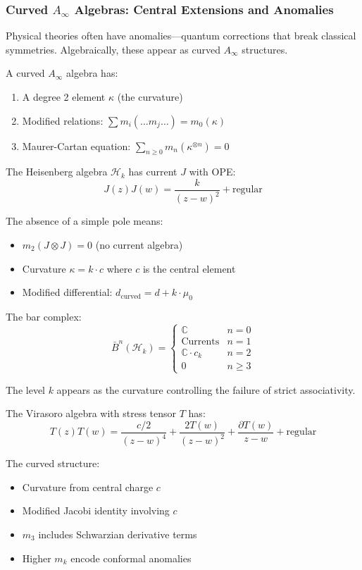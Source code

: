\subsubsection{Curved $A_\infty$ Algebras: Central Extensions and Anomalies}

Physical theories often have anomalies—quantum corrections that break classical symmetries. Algebraically, these appear as curved $A_\infty$ structures.

\begin{definition}
A curved $A_\infty$ algebra has:
\begin{enumerate}
\item A degree 2 element $\kappa$ (the curvature)
\item Modified relations: $\sum m_i(\ldots m_j \ldots) = m_0(\kappa)$
\item Maurer-Cartan equation: $\sum_{n \geq 0} m_n(\kappa^{\otimes n}) = 0$
\end{enumerate}
\end{definition}

\begin{example}
The Heisenberg algebra $\mathcal{H}_k$ has current $J$ with OPE:
$$J(z)J(w) = \frac{k}{(z-w)^2} + \text{regular}$$

The absence of a simple pole means:
\begin{itemize}
\item $m_2(J \otimes J) = 0$ (no current algebra)
\item Curvature $\kappa = k \cdot c$ where $c$ is the central element
\item Modified differential: $d_{\text{curved}} = d + k \cdot \mu_0$
\end{itemize}

The bar complex:
$$\bar{B}^n(\mathcal{H}_k) = \begin{cases}
\mathbb{C} & n = 0 \\
\text{Currents} & n = 1 \\
\mathbb{C} \cdot c_k & n = 2 \\
0 & n \geq 3
\end{cases}$$

The level $k$ appears as the curvature controlling the failure of strict associativity.
\end{example}

\begin{example}
The Virasoro algebra with stress tensor $T$ has:
$$T(z)T(w) = \frac{c/2}{(z-w)^4} + \frac{2T(w)}{(z-w)^2} + \frac{\partial T(w)}{z-w} + \text{regular}$$

The curved structure:
\begin{itemize}
\item Curvature from central charge $c$
\item Modified Jacobi identity involving $c$
\item $m_3$ includes Schwarzian derivative terms
\item Higher $m_k$ encode conformal anomalies
\end{itemize}
\end{example}

